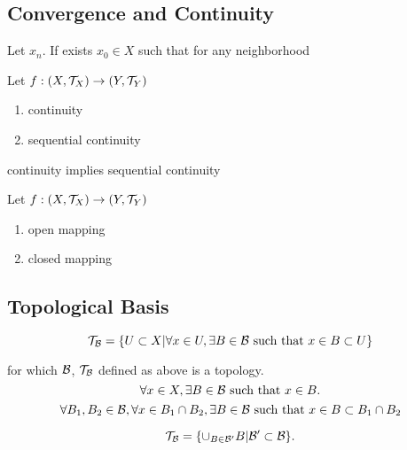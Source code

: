 \subsection{Convergence and Continuity}
\begin{definition}
    Let $x_n$. If exists $x_0\in X$ such that for any neighborhood
\end{definition}

\begin{definition}
    Let $f:(X,\mathcal{T}_X)\to(Y,\mathcal{T}_Y)$
    \begin{enumerate}[label=(\roman*)]
        \item continuity
        \item sequential continuity
    \end{enumerate}
\end{definition}
\begin{theorem}
    continuity implies sequential continuity
\end{theorem}


\begin{definition}
    Let $f:(X,\mathcal{T}_X)\to(Y,\mathcal{T}_Y)$
    \begin{enumerate}[label=(\roman*)]
        \item open mapping
        \item closed mapping
    \end{enumerate}
\end{definition}


\subsection{Topological Basis}



\begin{equation*}
    \mathcal{T}_{\mathcal{B}}=\{U\subset X|\forall x\in U,\exists B\in\mathcal{B} \text{ such that } x\in B\subset U\}
\end{equation*}

for which $\mathcal{B}$, $\mathcal{T}_{\mathcal{B}}$ defined as above is a topology.
\begin{equation*}
    \forall x\in X,\exists B\in\mathcal{B}\text{ such that }x\in B.
\end{equation*}
\begin{equation*}
    \forall B_1,B_2\in\mathcal{B},\forall x\in B_1\cap B_2,\exists B\in\mathcal{B}\text{ such that }x\in B\subset B_1\cap B_2
\end{equation*}


\begin{theorem}
    \begin{equation*}
        \mathcal{T}_{\mathcal{B}}=\{\cup_{B\in\mathcal{B}'}B|\mathcal{B}'\subset \mathcal{B}\}.
    \end{equation*}
\end{theorem}


